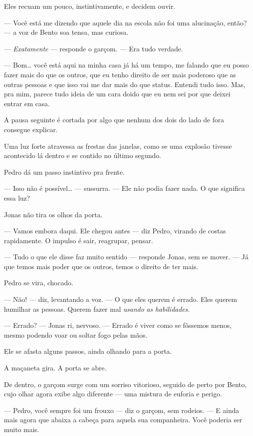 Eles recuam um pouco, instintivamente, e decidem ouvir.

— Você está me dizendo que aquele dia na escola não foi uma alucinação, então? — a voz de Bento soa tensa, mas curiosa.

— \textit{Exatamente} — responde o garçom. — Era tudo verdade.

— Bom… você está aqui na minha casa já há um tempo, me falando que eu posso fazer mais do que os outros, que eu tenho direito de ser mais poderoso que as outras pessoas e que isso vai me dar mais do que status. Entendi tudo isso.  
Mas, pra mim, parece tudo ideia de um cara doido que eu nem sei por que deixei entrar em casa.

A pausa seguinte é cortada por algo que nenhum dos dois do lado de fora consegue explicar.

Uma luz forte atravessa as frestas das janelas, como se uma explosão tivesse acontecido lá dentro e se contido no último segundo.

Pedro dá um passo instintivo pra frente.

— Isso não é possível… — sussurra. — Ele não podia fazer nada. O que significa essa luz?

Jonas não tira os olhos da porta.

— Vamos embora daqui. Ele chegou antes — diz Pedro, virando de costas rapidamente. O impulso é sair, reagrupar, pensar.

— Tudo o que ele disse faz muito sentido — responde Jonas, sem se mover. — Já que temos mais poder que os outros, temos o direito de ter mais.

Pedro se vira, chocado.

— Não! — diz, levantando a voz. — O que eles querem é errado.  
Eles querem humilhar as pessoas.  
Querem fazer mal \emph{usando as habilidades}.

— Errado? — Jonas ri, nervoso. — Errado é viver como se fôssemos menos, mesmo podendo voar ou soltar fogo pelas mãos.

Ele se afasta alguns passos, ainda olhando para a porta.

A maçaneta gira.  
A porta se abre.

De dentro, o garçom surge com um sorriso vitorioso, seguido de perto por Bento, cujo olhar agora exibe algo diferente — uma mistura de euforia e perigo.

— Pedro, você sempre foi um frouxo — diz o garçom, sem rodeios. — E ainda mais agora que abaixa a cabeça para aquela sua companheira. Você poderia ser muito mais.

